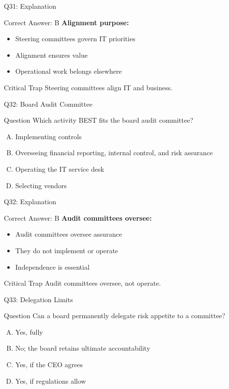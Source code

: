 \documentclass{beamer}
\begin{document}
	\begin{frame}{Q31: Explanation}
		\begin{block}{Correct Answer: B}
			\textbf{Alignment purpose:}
			\begin{itemize}
				\item Steering committees govern IT priorities
				\item Alignment ensures value
				\item Operational work belongs elsewhere
			\end{itemize}
		\end{block}
		\begin{alertblock}{Critical Trap}
			Steering committees align IT and business.
		\end{alertblock}
	\end{frame}
	
	\begin{frame}{Q32: Board Audit Committee}
		\begin{block}{Question}
			Which activity BEST fits the board audit committee?
		\end{block}
		\begin{enumerate}[(A)]
			\item Implementing controls
			\item Overseeing financial reporting, internal control, and risk assurance
			\item Operating the IT service desk
			\item Selecting vendors
		\end{enumerate}
	\end{frame}
	
	\begin{frame}{Q32: Explanation}
		\begin{block}{Correct Answer: B}
			\textbf{Audit committees oversee:}
			\begin{itemize}
				\item Audit committees oversee assurance
				\item They do not implement or operate
				\item Independence is essential
			\end{itemize}
		\end{block}
		\begin{alertblock}{Critical Trap}
			Audit committees oversee, not operate.
		\end{alertblock}
	\end{frame}
	
	\begin{frame}{Q33: Delegation Limits}
		\begin{block}{Question}
			Can a board permanently delegate risk appetite to a committee?
		\end{block}
		\begin{enumerate}[(A)]
			\item Yes, fully
			\item No; the board retains ultimate accountability
			\item Yes, if the CEO agrees
			\item Yes, if regulations allow
		\end{enumerate}
	\end{frame}
	
\end{document}
